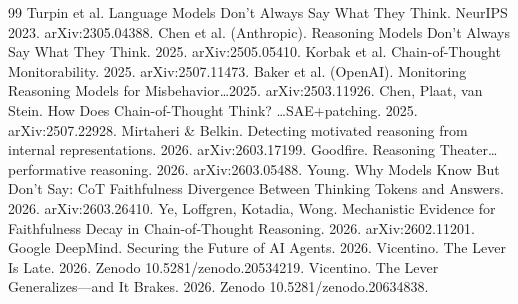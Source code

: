 \documentclass[11pt]{article}
\begin{document}
\begin{thebibliography}{99}\small
{} Turpin et al. Language Models Don't Always Say What They Think. NeurIPS 2023. arXiv:2305.04388.
 Chen et al. (Anthropic). Reasoning Models Don't Always Say What They Think. 2025. arXiv:2505.05410.
 Korbak et al. Chain-of-Thought Monitorability. 2025. arXiv:2507.11473.
 Baker et al. (OpenAI). Monitoring Reasoning Models for Misbehavior\dots 2025. arXiv:2503.11926.
 Chen, Plaat, van Stein. How Does Chain-of-Thought Think? \dots SAE+patching. 2025. arXiv:2507.22928.
 Mirtaheri \& Belkin. Detecting motivated reasoning from internal representations. 2026. arXiv:2603.17199.
 Goodfire. Reasoning Theater\dots performative reasoning. 2026. arXiv:2603.05488.
 Young. Why Models Know But Don't Say: CoT Faithfulness Divergence Between Thinking Tokens and Answers. 2026. arXiv:2603.26410.
 Ye, Loffgren, Kotadia, Wong. Mechanistic Evidence for Faithfulness Decay in Chain-of-Thought Reasoning. 2026. arXiv:2602.11201.
 Google DeepMind. Securing the Future of AI Agents. 2026.
 Vicentino. The Lever Is Late. 2026. Zenodo 10.5281/zenodo.20534219.
 Vicentino. The Lever Generalizes---and It Brakes. 2026. Zenodo 10.5281/zenodo.20634838.
\end{thebibliography}
\end{document}
